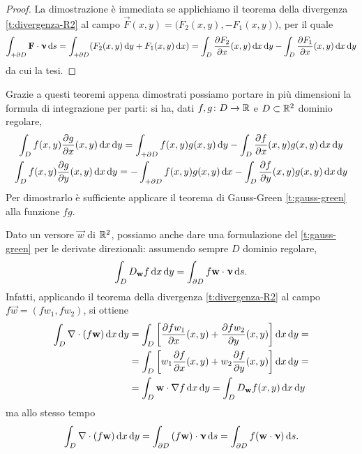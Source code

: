 \begin{proof}
	La dimostrazione è immediata se applichiamo il teorema della divergenza \ref{t:divergenza-R2} al campo $\vec F(x,y)=\big(F_2(x,y),-F_1(x,y)\big)$, per il quale
	\begin{equation}
		\int_{+\partial D}{\mathbf{F}}\cdot{\bm{\upnu}}\,\textup{d} s=\int_{+\partial D}(F_2(x,y)\,\textup{d} y+F_1(x,y)\,\textup{d} x)=\int_D\frac{\partial {F_2}}{\partial {x}}(x,y)\,\textup{d} x\,\textup{d} y-\int_D\frac{\partial {F_1}}{\partial {x}}(x,y)\,\textup{d} x\,\textup{d} y
	\end{equation}
	da cui la tesi.
\end{proof}
Grazie a questi teoremi appena dimostrati possiamo portare in più dimensioni la formula di integrazione per parti: si ha, dati $f,g\colon D\to\mathbb{R}$ e $D\subset\mathbb{R}^2$ dominio regolare,
\begin{gather}
	\int_D f(x,y)\frac{\partial {g}}{\partial {x}}(x,y)\,\textup{d} x\,\textup{d} y=\int_{+\partial D}f(x,y)g(x,y)\,\textup{d} y-\int_D\frac{\partial {f}}{\partial {x}}(x,y)g(x,y)\,\textup{d} x\,\textup{d} y\\
	\int_D f(x,y)\frac{\partial {g}}{\partial {y}}(x,y)\,\textup{d} x\,\textup{d} y=-\int_{+\partial D}f(x,y)g(x,y)\,\textup{d} x-\int_D\frac{\partial {f}}{\partial {y}}(x,y)g(x,y)\,\textup{d} x\,\textup{d} y
\end{gather}
Per dimostrarlo è sufficiente applicare il teorema di Gauss-Green \ref{t:gauss-green} alla funzione $fg$.

Dato un versore $\vec w$ di $\mathbb{R}^2$, possiamo anche dare una formulazione del \ref{t:gauss-green} per le derivate direzionali: assumendo sempre $D$ dominio regolare,
\begin{equation}
	\int_DD_{\mathbf{w}}f\,\textup{d} x\,\textup{d} y=\int_{\partial D}f{\mathbf{w}}\cdot{\bm{\upnu}}\,\textup{d} s.
\end{equation}
Infatti, applicando il teorema della divergenza \ref{t:divergenza-R2} al campo $f\vec w=(fw_1,fw_2)$, si ottiene
\begin{equation}
	\begin{split}
		\int_D\nabla\cdot(f\mathbf{w})\,\textup{d} x\,\textup{d} y&=\int_D\bigg[\frac{\partial {fw_1}}{\partial {x}}(x,y)+\frac{\partial {fw_2}}{\partial {y}}(x,y)\bigg]\,\textup{d} x\,\textup{d} y=\\
		&=\int_D\bigg[w_1\frac{\partial {f}}{\partial {x}}(x,y)+w_2\frac{\partial {f}}{\partial {y}}(x,y)\bigg]\,\textup{d} x\,\textup{d} y=\\
		&=\int_D{\mathbf{w}}\cdot{\nabla f}\,\textup{d} x\,\textup{d} y=\int_DD_{\mathbf{w}}f(x,y)\,\textup{d} x\,\textup{d} y
	\end{split}
\end{equation}
ma allo stesso tempo
\begin{equation}
	\int_D\nabla\cdot(f\mathbf{w})\,\textup{d} x\,\textup{d} y=\int_{\partial D}{(f\mathbf{w})}\cdot{\bm{\upnu}}\,\textup{d} s=\int_{\partial D}f({\mathbf{w}}\cdot{\bm{\upnu}})\,\textup{d} s.
\end{equation}

